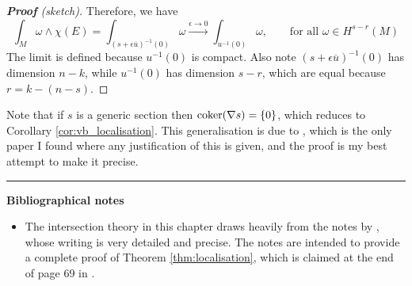 \begin{proof}[\textbf{\textit{Proof}} (sketch)]
	Therefore, we have 
	\[
	\int_{M} \omega \wedge \chi(E) 
	= \int_{(s+\epsilon \overline{u})^{-1}(0)} \omega
	\xrightarrow{\epsilon \to 0} 
	\int_{u^{-1}(0)} \omega, \qquad
	\text{for all } \omega\in H^{s-r}(M)
	\]
	The limit is defined because $u^{-1}(0)$ is compact. 
	Also note $(s+\epsilon \overline{u})^{-1}(0)$ has dimension $n-k$, while 
	$u^{-1}(0)$ has dimension $s-r$, which are equal because
	$r = k-(n-s)$. 

\end{proof}

Note that if $s$ is a generic section then  $\operatorname{coker} (\nabla s) = \{0\}$, which
reduces to Corollary \ref{cor:vb_localisation}. This generalisation is due to
\citet[Sec 3.3]{witten_coker}, which is the only paper I found where any 
justification of this is given, and the proof is my best attempt to make it
precise.  
 

\vspace{5mm}
\hrule 
\vspace{5mm}

\textbf{Bibliographical notes}
{\small
\begin{itemize}
	\item The intersection theory in this chapter draws heavily from the notes by
	\citet{nicolaescu_intersection}, whose writing is very detailed and
	precise. The notes are intended to provide a complete proof of Theorem
	\ref{thm:localisation}, which is claimed at the end of page 69 in 
	\citet{bott_tu}.
\end{itemize}
}

